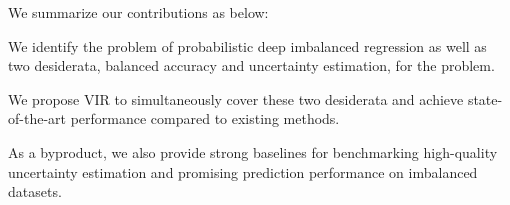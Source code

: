 

We summarize our contributions as below:
\begin{compactitem}
\item We identify the problem of probabilistic deep imbalanced regression as well as two desiderata, balanced accuracy and uncertainty estimation, for the problem.
\item We propose VIR to simultaneously cover these two desiderata and achieve state-of-the-art performance compared to existing methods.
\item As a byproduct, we also provide strong baselines for benchmarking {high-quality uncertainty estimation and promising prediction performance on imbalanced datasets.}
\end{compactitem}

